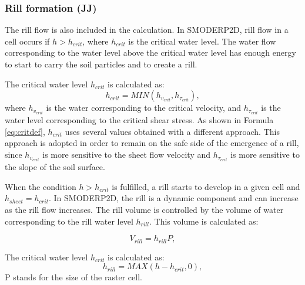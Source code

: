         \subsubsection{Rill formation (JJ)}

            The rill flow is also included in the calculation. In SMODERP2D, rill flow in a
            cell occurs if $h>h_{crit}$, where $h_{crit}$ is the critical water level. The
            water flow corresponding to the water level above the critical water level has
            enough energy to start to carry the soil particles and to create a rill.

            The critical water level $h_{crit}$ is calculated as:
            \begin{equation}
              h_{crit} = MIN(h_{v_{crit}},h_{\tau_{crit}}),
              \label{eq:critdef}
            \end{equation}
            where $h_{v_{crit}}$ is the water corresponding to the critical velocity, and
            $h_{\tau_{crit}}$ is the water level corresponding to the critical shear
            stress.  As shown in Formula \ref{eq:critdef}, $h_{crit}$ uses several values
            obtained with a different approach. This approach is adopted in order to remain
            on the safe side of the emergence of a rill, since $h_{v_{crit}}$ is more
            sensitive to the sheet flow velocity and $h_{\tau_{crit}}$ is more sensitive to
            the slope of the soil surface. 

            When the condition $h>h_{crit}$ is fulfilled, a rill starts to develop in a
            given cell and $h_{sheet}=h_{crit}$. In SMODERP2D, the rill is a dynamic component and
            can increase as the rill flow increases. The rill volume is controlled by the
            volume of water corresponding to the rill water level $h_{rill}$. This volume is
            calculated as:


            \begin{equation}
              V_{rill} = h_{rill}P,
              \label{eq:rillvol}
            \end{equation}

            The critical water level $h_{crit}$ is calculated as:
            \begin{equation}
              h_{rill} = MAX(h-h_{crit},0),
              \label{eq:hrill}
            \end{equation}
            P stands for the size of the raster cell. 

